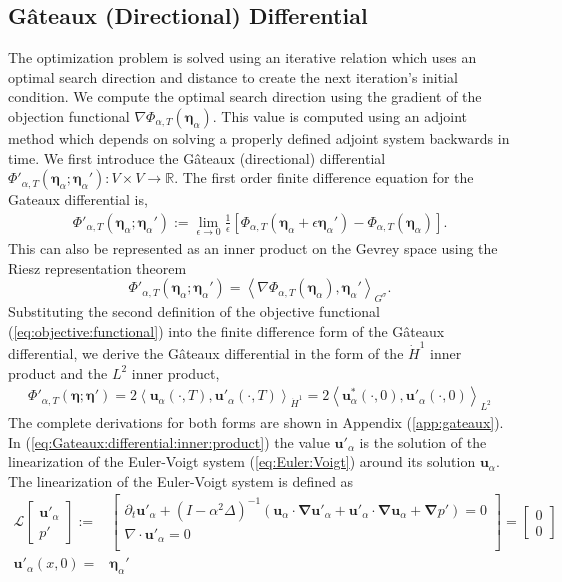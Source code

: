 \documentclass[12pt]{article}
\newcommand{\la}{\left\langle}
\newcommand{\ra}{\right\rangle}
\def\hdo{\dot{H}^1}
\def\pat{\Phi_{\alpha,T}}
\def\ppat{\Phi'_{\alpha,T}}
\def\ua{\boldsymbol u_\alpha}
\def\upa{\boldsymbol u'_\alpha}
\def\usa{\boldsymbol u^*_\alpha}
\def\bn{\boldsymbol \nabla}
\def\be{\boldsymbol \eta}
\def\bea{\boldsymbol \eta_\alpha}
\def\L{\mathcal{L}}
\numberwithin{equation}{section}
\begin{document}
\subsection{G\^{a}teaux (Directional) Differential} \label{sec:Gateaux Directional Differential}
The optimization problem is solved using an iterative relation which uses an optimal search direction and distance to create the next iteration's initial condition. We compute the optimal search direction using the gradient of the objection functional $\nabla\pat(\bea)$. This value is computed using an adjoint method which depends on solving a properly defined adjoint system backwards in time. We first introduce the G\^{a}teaux (directional) differential $\ppat(\bea;\bea'): V\times V \rightarrow \mathbb{R}$. The first order finite difference equation for the Gateaux differential is,
\begin{align}\label{eq:Gateaux:differential}
\ppat(\bea;\bea'):=\lim_{\epsilon\rightarrow 0}\frac{1}{\epsilon}\left[\pat(\bea+\epsilon\bea')-\pat(\bea)\right].
\end{align}
This can also be represented as an inner product on the Gevrey space using the Riesz representation theorem \cite{luenberger_optimization_nodate}
\begin{equation}\label{eq:Gateaux:differential:riesz}
\ppat(\bea;\bea') = \la \nabla\pat(\bea),\bea'\ra_{G^\sigma}.
\end{equation}
Substituting the second definition of the objective functional (\ref{eq:objective:functional}) into the finite difference form of the G\^{a}teaux differential, we derive the G\^{a}teaux differential in the form of the $\hdo$ inner product and the $L^2$ inner product,
\begin{align}\label{eq:Gateaux:differential:inner:product}
\ppat(\be;\be')=  2\la \ua(\cdot,T),\upa(\cdot,T)\ra_{\hdo} = 2\la \usa(\cdot,0),\upa(\cdot,0)\ra_{L^2}
\end{align}
The complete derivations for both forms are shown in Appendix (\ref{app:gateaux}). In (\ref{eq:Gateaux:differential:inner:product}) the value $\upa$ is the solution of the linearization of the Euler-Voigt system (\ref{eq:Euler:Voigt}) around its solution $\ua$. The linearization of the Euler-Voigt system is defined as
\begin{subequations}\label{eq:Euler-Voigt:linearization}
\begin{align}
\L\begin{bmatrix}
\upa \\
p'
\end{bmatrix} :=& 
\begin{bmatrix}
\partial_t \upa +(I-\alpha^2\Delta)^{-1}(\ua\cdot\bn\upa +\upa\cdot\bn \ua+\bn p')=0\\
      \nabla\cdot \upa = 0\\
\end{bmatrix} = \begin{bmatrix}
0\\
0
\end{bmatrix}\\
\upa(x,0) =& \bea'
\end{align}
\end{subequations}
\end{document}

